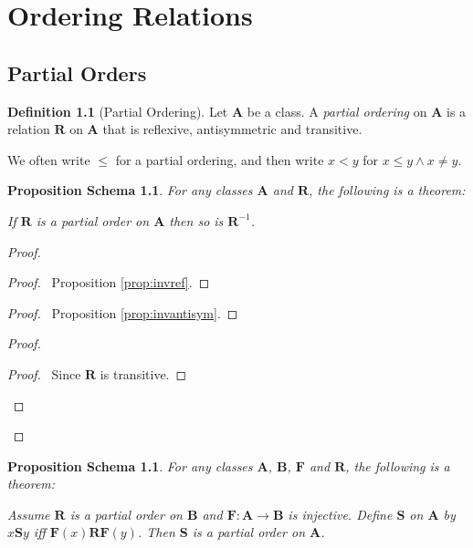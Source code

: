 \documentclass{book}
\let\qed\relax
\newtheorem{props}[ax]{Proposition Schema}
\theoremstyle{definition}
\newtheorem{df}[ax]{Definition}
\begin{document}
\chapter{Ordering Relations}

\section{Partial Orders}

\begin{df}[Partial Ordering]
Let $\mathbf{A}$ be a class. A \emph{partial ordering} on $\mathbf{A}$ is a relation $\mathbf{R}$ on $\mathbf{A}$ that is reflexive, antisymmetric and transitive.

We often write $\leq$ for a partial ordering, and then write $x < y$ for $x \leq y \wedge x \neq y$.
\end{df}

\begin{props}
\label{prop:invposet}
For any classes $\mathbf{A}$ and $\mathbf{R}$, the following is a theorem:

If $\mathbf{R}$ is a partial order on $\mathbf{A}$ then so is $\mathbf{R}^{-1}$.
\end{props}

\begin{proof}
\pf
{}
\begin{proof}
	\pf\ Proposition \ref{prop:invref}.
\end{proof}
\begin{proof}
	\pf\ Proposition \ref{prop:invantisym}.
\end{proof}
\begin{proof}
	\begin{proof}
		\pf\ Since $\mathbf{R}$ is transitive.
	\end{proof}
\end{proof}
\qed
\end{proof}

\begin{props}
\label{prop:subposet}
For any classes $\mathbf{A}$, $\mathbf{B}$, $\mathbf{F}$ and $\mathbf{R}$, the following is a theorem:

Assume $\mathbf{R}$ is a partial order on $\mathbf{B}$ and $\mathbf{F} : \mathbf{A} \rightarrow \mathbf{B}$ is injective. Define $\mathbf{S}$ on $\mathbf{A}$ by $x \mathbf{S} y$ iff $\mathbf{F}(x) \mathbf{R} \mathbf{F}(y)$. Then $\mathbf{S}$ is a partial order on $\mathbf{A}$.
\end{props}
\end{document}
